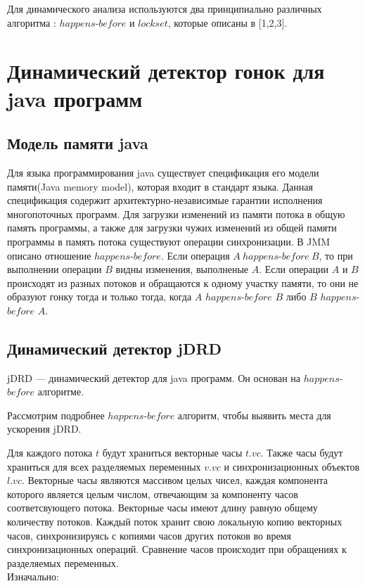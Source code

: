 Для динамического анализа используются два принципиально различных алгоритма : $happens$-$before$ и $lockset$, которые описаны в [1,2,3].


\FloatBarrier
\section{Динамический детектор гонок для java программ}

\FloatBarrier
\subsection{Модель памяти java}
Для языка программирования java существует спецификация его модели памяти(Java memory model), которая входит в стандарт языка. Данная спецификация содержит архитектурно-независимые гарантии исполнения многопоточных программ.
Для загрузки изменений из памяти потока в общую память программы, а также для загрузки чужих изменений из общей памяти программы в память потока существуют операции синхронизации. В JMM описано отношение $happens$-$before$. Если операция $A\ happens$-$before\ B$, то при выполнении операции $B$ видны изменения, выполненые $A$. Если операции $A$ и $B$ происходят из разных потоков и обращаются к одному участку памяти, то они не образуют гонку тогда и только тогда, когда $A$ $happens$-$before$ $B$ либо $B$ $happens$-$before$ $A$.



\subsection{Динамический детектор jDRD}
jDRD --- динамический детектор для java программ. Он основан на $happens$-$before$ алгоритме. 

Рассмотрим подробнее $happens$-$before$ алгоритм, чтобы выявить места для ускорения jDRD.

Для каждого потока $t$ будут храниться векторные часы $t.vc$. Также часы будут храниться для всех разделяемых переменных $v.vc$ и синхронизационных объектов $l.vc$.
Векторные часы являются массивом целых чисел, каждая компонента которого является целым числом, отвечающим за компоненту часов соответсвующего потока. Векторные часы имеют длину равную общему количеству потоков. Каждый поток хранит свою локальную копию векторных часов, синхронизируясь с копиями часов других потоков во время синхронизационных операций.
Сравнение часов происходит при обращениях к разделяемых переменных.
\\Изначально:  

